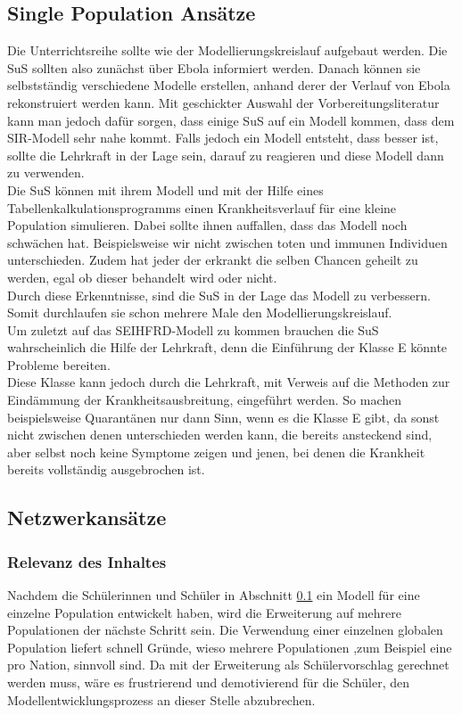 \subsection{Single Population Ansätze}\label{ssec:did:spa}
\ellen
Die Unterrichtsreihe sollte wie der Modellierungskreislauf aufgebaut werden. Die SuS sollten also zunächst über Ebola informiert werden. Danach können sie selbstständig verschiedene Modelle erstellen, anhand derer der Verlauf von Ebola rekonstruiert werden kann. Mit geschickter Auswahl der Vorbereitungsliteratur kann man jedoch dafür sorgen, dass einige SuS auf ein Modell kommen, dass dem SIR-Modell sehr nahe kommt. Falls jedoch ein Modell entsteht, dass besser ist, sollte die Lehrkraft in der Lage sein, darauf zu reagieren und diese Modell dann zu verwenden.\\
Die SuS können mit ihrem Modell und mit der Hilfe eines Tabellenkalkulationsprogramms einen Krankheitsverlauf für eine kleine Population simulieren. Dabei sollte ihnen auffallen, dass das Modell noch schwächen hat. Beispielsweise wir nicht zwischen toten und immunen Individuen unterschieden. Zudem hat jeder der erkrankt die selben Chancen geheilt zu werden, egal ob dieser behandelt wird oder nicht.\\
 Durch diese Erkenntnisse, sind die SuS in der Lage das Modell zu verbessern. Somit durchlaufen sie schon mehrere Male den Modellierungskreislauf.\\
 Um zuletzt auf das SEIHFRD-Modell zu kommen brauchen die SuS wahrscheinlich die Hilfe der Lehrkraft, denn die Einführung der Klasse \glqq E\grqq{} könnte Probleme bereiten.\\
 Diese Klasse kann jedoch durch die Lehrkraft, mit Verweis auf die Methoden zur Eindämmung der Krankheitsausbreitung, eingeführt werden. So machen beispielsweise Quarantänen nur dann Sinn, wenn es die Klasse \glqq E\grqq{} gibt, da sonst nicht zwischen denen unterschieden werden kann, die bereits ansteckend sind, aber selbst noch keine Symptome zeigen und jenen, bei denen die Krankheit bereits vollständig ausgebrochen ist.  
\subsection{Netzwerkansätze}\steffen
\subsubsection*{Relevanz des Inhaltes}
Nachdem die Schülerinnen und Schüler in Abschnitt \ref{ssec:did:spa} ein Modell für eine einzelne Population entwickelt haben, wird die Erweiterung auf mehrere Populationen der nächste Schritt sein. Die Verwendung einer einzelnen globalen Population liefert schnell Gründe, wieso mehrere Populationen ,zum Beispiel eine pro Nation, sinnvoll sind. Da mit der Erweiterung als Schülervorschlag gerechnet werden muss, wäre es frustrierend und demotivierend für die Schüler, den Modellentwicklungsprozess an dieser Stelle abzubrechen.

